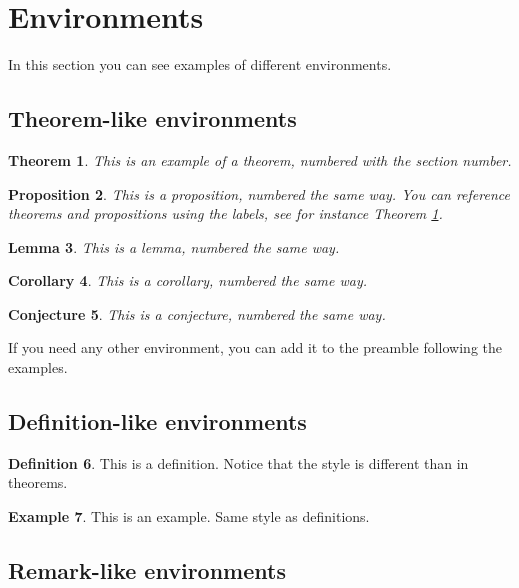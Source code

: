 \documentclass[12,twoside]{TFG-GM}
\newtheorem{theorem}{Theorem}[section]
\newtheorem{proposition}[theorem]{Proposition}
\newtheorem{lemma}[theorem]{Lemma}
\newtheorem{corollary}[theorem]{Corollary}
\newtheorem{conjecture}[theorem]{Conjecture}
\theoremstyle{definition}
\newtheorem{definition}[theorem]{Definition}
\newtheorem{example}[theorem]{Example}
\theoremstyle{remark}
\begin{document}
\section{Environments}

In this section you can see examples of different environments.

\subsection{Theorem-like environments}

\begin{theorem} \label{th:example}
This is an example of a theorem, numbered with the section number.
\end{theorem}

\begin{proposition}
This is a proposition, numbered the same way. You can reference theorems and propositions using the labels, see for instance Theorem \ref{th:example}.
\end{proposition}

\begin{lemma}
This is a lemma, numbered the same way.
\end{lemma}

\begin{corollary}
This is a corollary, numbered the same way.
\end{corollary}

\begin{conjecture}
This is a conjecture, numbered the same way.
\end{conjecture}

If you need any other environment, you can add it to the preamble following the examples.

\subsection{Definition-like environments}

\begin{definition}
This is a definition. Notice that the style is different than in theorems.
\end{definition}

\begin{example}
This is an example. Same style as definitions.
\end{example}

\subsection{Remark-like environments}
\end{document}
